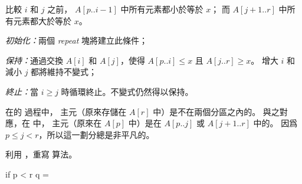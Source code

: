 \startANSWER
比較 $i$ 和 $j$ 之前， $A[p..i-1]$ 中所有元素都小於等於 $x$；
而 $A[j+1..r]$ 中所有元素都大於等於 $x$。

\emph{初始化：}兩個 \emph{repeat} 塊將建立此條件；

\emph{保持：}通過交換 $A[i]$ 和 $A[j]$，使得 $A[p..i]\le x$ 且 $A[j..r]\ge x$。
增大 $i$ 和減小 $j$ 都將維持不變式；

\emph{終止：}當 $i\ge j$ 時循環終止。不變式仍然得以保持。
\stopANSWER

在 的  過程中，
主元（原來存儲在 $A[r]$ 中）是不在兩個分區之內的。
與之對應，在  中，
主元（原來在 $A[p]$ 中）是在 $A[p..j]$ 或 $A[j+1..r]$ 中的。
因爲 $p\le j<r$，所以這一劃分總是非平凡的。
\startigBase[a,continue]
\item 利用 ，重寫  算法。
\stopigBase

\startANSWER
{}
\startCLRSCODE
if p < r
	q = 
\stopCLRSCODE
\stopANSWER
\stopPROBLEM

